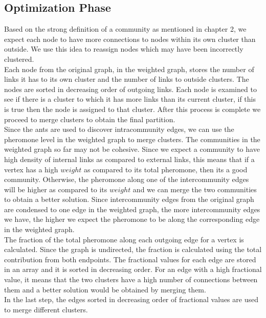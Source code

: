 \begin{spacing}{1.5}
\section{Optimization Phase}

Based on the strong definition of a community as mentioned in chapter 2, we expect each node to have more connections to nodes within its own cluster than outside. We use this idea to reassign nodes which may have been incorrectly clustered.\\
\indent Each node from the original graph, in the weighted graph, stores the number of links it has to its own cluster and the number of links to outside clusters. The nodes are sorted in decreasing order of outgoing links. Each node is examined to see if there is a cluster to which it has more links than its current cluster, if this is true then the node is assigned to that cluster. After this process is complete we proceed to merge clusters to obtain the final partition.\\
\indent Since the ants are used to discover intracommunity edges, we can use the pheromone level in the weighted graph to merge clusters. The communities in the weighted graph so far may not be cohesive. Since we expect a community to have high density of internal links as compared to external links, this means that if a vertex has a high $weight$ as compared to its total pheromone, then its a good community. Otherwise, the pheromone along one of the intercommunity edges will be higher as compared to its $weight$ and we can merge the two communities to obtain a better solution. Since intercommunity edges from the original graph are condensed to one edge in the weighted graph, the more intercommunity edges we have, the higher we expect the pheromone to be along the corresponding edge in the weighted graph.\\
\indent The fraction of the total pheromone along each outgoing edge for a vertex is calculated. Since the graph is undirected, the fraction is calculated using the total contribution from both endpoints. The fractional values for each edge are stored in an array and it is sorted in decreasing order. For an edge with a high fractional value, it means that the two clusters have a high number of connections between them and a better solution would be obtained by merging them.\\
\indent In the last step, the edges sorted in decreasing order of fractional values are used to merge different clusters.



\end{spacing}